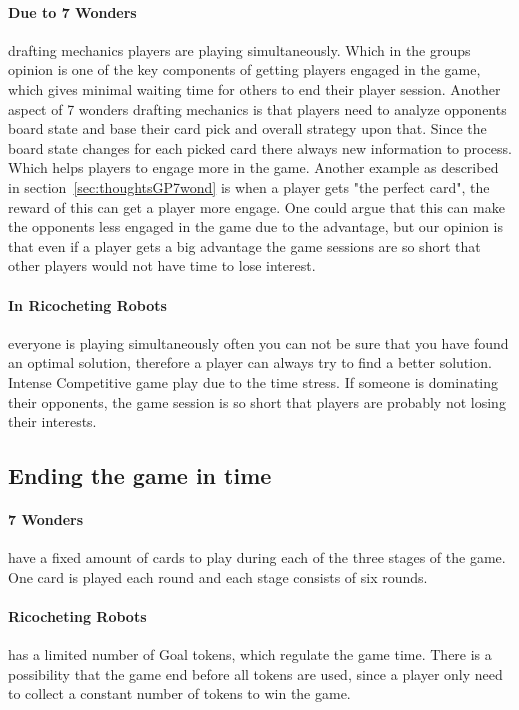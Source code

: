 \documentclass[a4paper]{article}
\begin{document}
\paragraph{Due to 7 Wonders} drafting mechanics players are playing simultaneously. Which in the groups opinion is one of the key components of getting players engaged in the game, which gives minimal waiting time for others to end their player session. Another aspect of 7 wonders drafting mechanics is that players need to analyze opponents board state and base their card pick and overall strategy upon that. Since the board state changes for each picked card there always new information to process. Which helps players to engage more in the game.
Another example as described in section~\ref{sec:thoughtsGP7wond} is when a player gets "the perfect card", the reward of this can get a player more engage. One could argue that this can make the opponents less engaged in the game due to the advantage, but our opinion is that even if a player gets a big advantage the game sessions are so short that other players would not have time to lose interest.  

\paragraph{In Ricocheting Robots} everyone is playing simultaneously often you can not be sure that you have found an optimal solution, therefore a player can always try to find a better solution. Intense Competitive game play due to the time stress. If someone is dominating their opponents, the game session is so short that players are probably not losing their interests.

\subsection{Ending the game in time}
\paragraph{7 Wonders} have a fixed amount of cards to play during each of the three stages of the game. One card is played each round and each stage consists of six rounds.

\paragraph{Ricocheting Robots} has a limited number of Goal tokens, which regulate the game time. There is a possibility that the game end before all tokens are used, since a player only need to collect a constant number of tokens to win the game.
\end{document}
